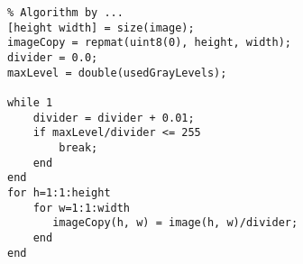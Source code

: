 

\begin{verbatim}
% Algorithm by ... 
[height width] = size(image);
imageCopy = repmat(uint8(0), height, width);
divider = 0.0;
maxLevel = double(usedGrayLevels);

while 1
    divider = divider + 0.01;
    if maxLevel/divider <= 255
        break;
    end
end
for h=1:1:height
    for w=1:1:width
       imageCopy(h, w) = image(h, w)/divider;
    end
end
\end{verbatim}
